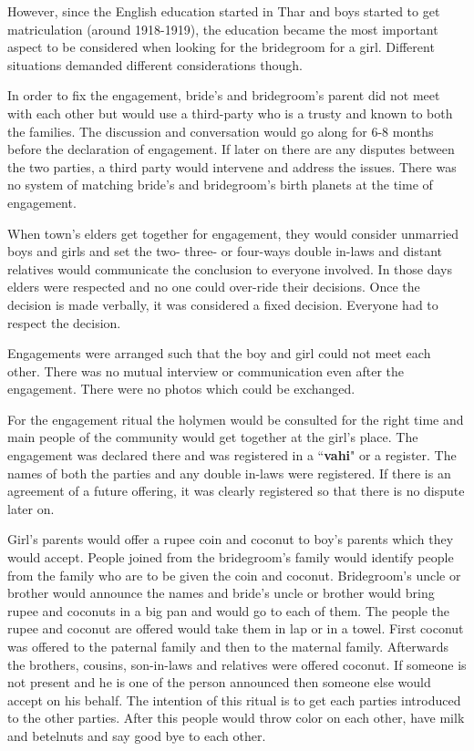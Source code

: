 However, since the English education started in Thar and boys started to get
matriculation (around 1918-1919), the education became the most important
aspect to be considered when looking for the bridegroom for a girl. Different
situations demanded different considerations though.

In order to fix the engagement, bride's and bridegroom's parent did not meet with
each other but would use a third-party who is a trusty and known to both the
families. The discussion and conversation would go along for 6-8 months before
the declaration of engagement. If later on there are any disputes between the
two parties, a third party would intervene and address the issues. There was
no system of matching bride's and bridegroom's birth planets at the time of
engagement.

When town's elders get together for engagement, they would consider unmarried
boys and girls and set the two- three- or four-ways double in-laws and distant
relatives would communicate the conclusion to everyone involved. In those days
elders were respected and no one could over-ride their decisions. Once the
decision is made verbally, it was considered a fixed decision. Everyone had to
respect the decision.

Engagements were arranged such that the boy and girl could not meet each other.
There was no mutual interview or communication even after the engagement. There
were no photos which could be exchanged.

For the engagement ritual the holymen would be consulted for the right time and
main people of the community would get together at the girl's place. The
engagement was declared there and was registered in a ``\textbf{vahi}" or a
register. The names of both the parties and any double in-laws were registered.
If there is an agreement of a future offering, it was clearly registered so
that there is no dispute later on.

Girl's parents would offer a rupee coin and coconut to boy's parents which they
would accept. People joined from the bridegroom's family would identify people from
the family who are to be given the coin and coconut. Bridegroom's uncle or brother
would announce the names and bride's uncle or brother would bring rupee and
coconuts in a big pan and would go to each of them. The people the rupee and
coconut are offered would take them in lap or in a towel. First coconut was
offered to the paternal family and then to the maternal family. Afterwards the
brothers, cousins, son-in-laws and relatives were offered coconut. If someone
is not present and he is one of the person announced then someone else would
accept on his behalf. The intention of this ritual is to get each parties
introduced to the other parties. After this people would throw color on each
other, have milk and betelnuts and say good bye to each other.

